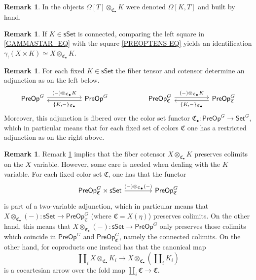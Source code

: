 \documentclass[a4paper,10pt
,draft
]{article}%
\numberwithin{equation}{section}
\numberwithin{figure}{section}
\theoremstyle{definition} %
\newtheorem{remark}[equation]{Remark}%
\newcommand{\1}{\ensuremath{\mathbbm 1}}%
\begin{document}
\begin{remark}\label{BYHAND1 REM}
	In \cite[\S 7.1]{CM13b}
	the objects
	$\Omega[T] \otimes_{\mathfrak{C}_{\bullet}} K$ were denoted 
	$\Omega[K,T]$
	and built by hand.
\end{remark}


\begin{remark}\label{OTIMCON REM}
	If $K \in \mathsf{sSet}$ is connected,
	comparing the left square in \eqref{GAMMASTAR_EQ}
	with the square \eqref{PREOPTENS EQ} yields an identification
	$\gamma_! \left(X \times K\right) \simeq 
	X \otimes_{\mathfrak{C}_{\bullet}} K$.
\end{remark}


\begin{remark}\label{TENSCOADJ REM}
	For each fixed $K \in \mathsf{sSet}$
	the fiber tensor and cotensor 
	determine an adjunction as on the left below.
\[
\begin{tikzcd}[column sep =50]
	\mathsf{PreOp}^G \ar[shift left=1]{r}
	{(-) \otimes_{\mathfrak{C}_{\bullet}} K}
&
	\mathsf{PreOp}^G \ar[shift left=1]{l}
	{\{K,-\}_{\mathfrak{C}_{\bullet}}}
&
	\mathsf{PreOp}^G_{\mathfrak{C}} \ar[shift left=1]{r}
	{(-) \otimes_{\mathfrak{C}_{\bullet}} K}
&
	\mathsf{PreOp}^G_{\mathfrak{C}} \ar[shift left=1]{l}
	{\{K,-\}_{\mathfrak{C}_{\bullet}}}
\end{tikzcd}
\]
Moreover, this adjunction is fibered over the color set functor
$\mathfrak{C}_{\bullet} \colon
\mathsf{PreOp}^G \to \mathsf{Set}^G$,
which in particular means that for each fixed set of colors
$\mathfrak{C}$
one has a restricted adjunction as on the right above.
\end{remark}


\begin{remark}\label{NOTTWOVARADJ REM}
	Remark \ref{TENSCOADJ REM} implies that the fiber cotensor
	$X \otimes_{\mathfrak{C}_{\bullet}} K$
	preserves colimits on the $X$ variable.
	However, some care is needed when dealing with the 
	$K$ variable.
	For each fixed color set $\mathfrak{C}$, one has that the functor
\[
\begin{tikzcd}[row sep = 0, column sep = 40pt]
	\mathsf{PreOp}^G_{\mathfrak{C}} \times \mathsf{sSet} \ar{r}{(-)\otimes_{\mathfrak{C}_{\bullet}}(-)} 
&
	\mathsf{PreOp}^G_{\mathfrak{C}}
\end{tikzcd}
\]
is part of a two-variable adjunction,
which in particular means that
$X \otimes_{\mathfrak{C}_{\bullet}} (-) \colon 
\mathsf{sSet} \to \mathsf{PreOp}^G_{\mathfrak{C}}$ 
(where $\mathfrak{C}=X(\eta)$)
preserves colimits.
On the other hand, this means that
$X \otimes_{\mathfrak{C}_{\bullet}} (-) \colon
\mathsf{sSet} \to \mathsf{PreOp}^G$
only preserves those colimits which coincide in
$\mathsf{PreOp}^G$ and $\mathsf{PreOp}^G_{\mathfrak{C}}$,
namely the connected colimits.
%
On the other hand, for coproducts one instead has that the canonical map
\[
\amalg_i X \otimes_{\mathfrak{C}_{\bullet}} K_i
	\to
X \otimes_{\mathfrak{C}_{\bullet}} (\amalg_i K_i)
\]
is a cocartesian arrow over the fold map
$\amalg_i \mathfrak{C} \to \mathfrak{C}$.
\end{remark}
\end{document}
